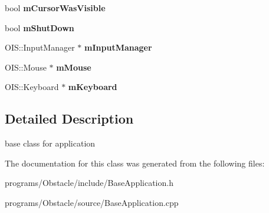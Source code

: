 \begin{DoxyCompactItemize}
\item 
bool {\bfseries m\+Cursor\+Was\+Visible}\hypertarget{class_base_application_ac7e861799862cb645f1d78b170aef80d}{}\label{class_base_application_ac7e861799862cb645f1d78b170aef80d}

\item 
bool {\bfseries m\+Shut\+Down}\hypertarget{class_base_application_a755f26d3a9915aaf830750d877e39d86}{}\label{class_base_application_a755f26d3a9915aaf830750d877e39d86}

\item 
O\+I\+S\+::\+Input\+Manager $\ast$ {\bfseries m\+Input\+Manager}\hypertarget{class_base_application_abc9503c8462e225b5d0d55c952d9e4a9}{}\label{class_base_application_abc9503c8462e225b5d0d55c952d9e4a9}

\item 
O\+I\+S\+::\+Mouse $\ast$ {\bfseries m\+Mouse}\hypertarget{class_base_application_add9b97fbe64da2814d3af113bac58c43}{}\label{class_base_application_add9b97fbe64da2814d3af113bac58c43}

\item 
O\+I\+S\+::\+Keyboard $\ast$ {\bfseries m\+Keyboard}\hypertarget{class_base_application_a9d6e19cf50c47379fbaae55bff28079c}{}\label{class_base_application_a9d6e19cf50c47379fbaae55bff28079c}

\end{DoxyCompactItemize}


\subsection{Detailed Description}
base class for application 

The documentation for this class was generated from the following files\+:\begin{DoxyCompactItemize}
\item 
programs/\+Obstacle/include/Base\+Application.\+h\item 
programs/\+Obstacle/source/Base\+Application.\+cpp\end{DoxyCompactItemize}
